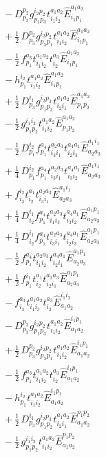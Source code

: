 \documentclass[11pt]{article}
\begin{document}
\begin{align}
&\quad - D^{p_{2}}_{p_{3}} g^{i_{2}p_{2}}_{p_{1}p_{3}} t^{a_{1}a_{2}}_{i_{1}i_{2}} \hat{E}^{a_{1}a_{2}}_{i_{1}p_{1}} \\
&\quad + \tfrac{1}{2}\, D^{p_{2}}_{p_{3}} g^{i_{2}p_{2}}_{p_{3}p_{1}} t^{a_{1}a_{2}}_{i_{1}i_{2}} \hat{E}^{a_{1}a_{2}}_{i_{1}p_{1}} \\
&\quad - \tfrac{1}{2}\, f^{a_{3}}_{p_{1}} t^{a_{1}a_{2}}_{i_{1}i_{2}} t^{a_{3}}_{i_{2}} \hat{E}^{a_{1}a_{2}}_{i_{1}p_{1}} \\
&\quad - h^{i_{2}}_{p_{1}} t^{a_{1}a_{2}}_{i_{1}i_{2}} \hat{E}^{a_{1}a_{2}}_{i_{1}p_{1}} \\
&\quad + \tfrac{1}{2}\, D^{i_{1}}_{p_{3}} g^{i_{2}p_{3}}_{p_{1}p_{2}} t^{a_{1}a_{2}}_{i_{2}i_{1}} \hat{E}^{a_{1}a_{2}}_{p_{1}p_{2}} \\
&\quad - \tfrac{1}{2}\, g^{i_{1}i_{2}}_{p_{1}p_{2}} t^{a_{1}a_{2}}_{i_{1}i_{2}} \hat{E}^{a_{1}a_{2}}_{p_{1}p_{2}} \\
&\quad - \tfrac{1}{2}\, D^{i_{2}}_{p_{1}} f^{a_{4}}_{p_{1}} t^{a_{2}a_{3}}_{i_{3}i_{1}} t^{a_{4}a_{1}}_{i_{2}i_{3}} \hat{E}^{a_{1}i_{1}}_{a_{2}a_{3}} \\
&\quad + \tfrac{1}{4}\, D^{i_{2}}_{p_{1}} f^{a_{4}}_{p_{1}} t^{a_{2}a_{3}}_{i_{3}i_{1}} t^{a_{4}a_{1}}_{i_{3}i_{2}} \hat{E}^{a_{1}i_{1}}_{a_{2}a_{3}} \\
&\quad + f^{i_{2}}_{i_{3}} t^{a_{1}}_{i_{2}} t^{a_{2}a_{3}}_{i_{3}i_{1}} \hat{E}^{a_{1}i_{1}}_{a_{2}a_{3}} \\
&\quad + \tfrac{1}{4}\, D^{i_{1}}_{i_{2}} f^{a_{4}}_{p_{1}} t^{a_{2}a_{3}}_{i_{1}i_{3}} t^{a_{4}a_{1}}_{i_{3}i_{2}} \hat{E}^{a_{1}p_{1}}_{a_{2}a_{3}} \\
&\quad + \tfrac{1}{4}\, D^{i_{1}}_{i_{2}} f^{a_{4}}_{p_{1}} t^{a_{2}a_{3}}_{i_{3}i_{1}} t^{a_{4}a_{1}}_{i_{2}i_{3}} \hat{E}^{a_{1}p_{1}}_{a_{2}a_{3}} \\
&\quad - \tfrac{1}{2}\, f^{a_{4}}_{p_{1}} t^{a_{2}a_{3}}_{i_{1}i_{2}} t^{a_{4}a_{1}}_{i_{2}i_{1}} \hat{E}^{a_{1}p_{1}}_{a_{2}a_{3}} \\
&\quad + \tfrac{1}{2}\, f^{i_{1}}_{p_{1}} t^{a_{1}}_{i_{2}} t^{a_{2}a_{3}}_{i_{2}i_{1}} \hat{E}^{a_{1}p_{1}}_{a_{2}a_{3}} \\
&\quad - f^{a_{3}}_{i_{3}} t^{a_{1}a_{2}}_{i_{1}i_{3}} t^{a_{3}}_{i_{2}} \hat{E}^{i_{1}i_{2}}_{a_{1}a_{2}} \\
&\quad - D^{p_{2}}_{p_{3}} g^{i_{2}p_{2}}_{p_{1}p_{3}} t^{a_{1}a_{2}}_{i_{1}i_{2}} \hat{E}^{i_{1}p_{1}}_{a_{1}a_{2}} \\
&\quad + \tfrac{1}{2}\, D^{p_{2}}_{p_{3}} g^{i_{2}p_{2}}_{p_{3}p_{1}} t^{a_{1}a_{2}}_{i_{1}i_{2}} \hat{E}^{i_{1}p_{1}}_{a_{1}a_{2}} \\
&\quad - \tfrac{1}{2}\, f^{a_{3}}_{p_{1}} t^{a_{1}a_{2}}_{i_{1}i_{2}} t^{a_{3}}_{i_{2}} \hat{E}^{i_{1}p_{1}}_{a_{1}a_{2}} \\
&\quad - h^{i_{2}}_{p_{1}} t^{a_{1}a_{2}}_{i_{1}i_{2}} \hat{E}^{i_{1}p_{1}}_{a_{1}a_{2}} \\
&\quad + \tfrac{1}{2}\, D^{i_{1}}_{p_{3}} g^{i_{2}p_{3}}_{p_{1}p_{2}} t^{a_{1}a_{2}}_{i_{2}i_{1}} \hat{E}^{p_{1}p_{2}}_{a_{1}a_{2}} \\
&\quad - \tfrac{1}{2}\, g^{i_{1}i_{2}}_{p_{1}p_{2}} t^{a_{1}a_{2}}_{i_{1}i_{2}} \hat{E}^{p_{1}p_{2}}_{a_{1}a_{2}}
\end{align}
\end{document}

